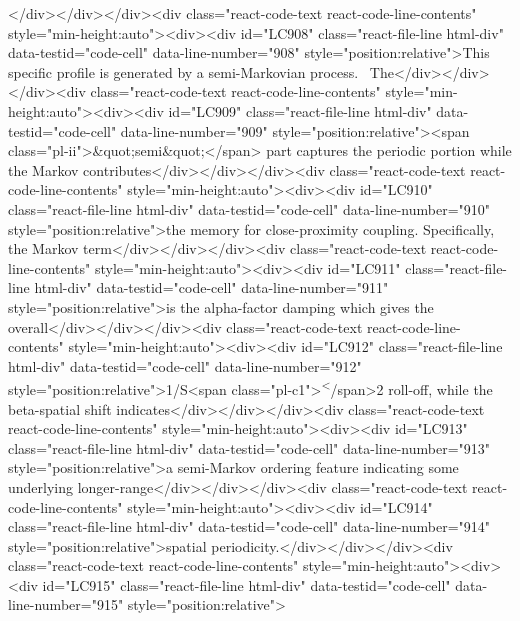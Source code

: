 {{{{{{</div></div></div><div class="react-code-text react-code-line-contents" style="min-height:auto"><div><div id="LC908" class="react-file-line html-div" data-testid="code-cell" data-line-number="908" style="position:relative">This specific profile is generated by a semi-Markovian process.~ The</div></div></div><div class="react-code-text react-code-line-contents" style="min-height:auto"><div><div id="LC909" class="react-file-line html-div" data-testid="code-cell" data-line-number="909" style="position:relative"><span class="pl-ii">&quot;semi&quot;</span> part captures the periodic portion while the Markov contributes</div></div></div><div class="react-code-text react-code-line-contents" style="min-height:auto"><div><div id="LC910" class="react-file-line html-div" data-testid="code-cell" data-line-number="910" style="position:relative">the memory for close-proximity coupling. Specifically, the Markov term</div></div></div><div class="react-code-text react-code-line-contents" style="min-height:auto"><div><div id="LC911" class="react-file-line html-div" data-testid="code-cell" data-line-number="911" style="position:relative">is the alpha-factor damping which gives the overall</div></div></div><div class="react-code-text react-code-line-contents" style="min-height:auto"><div><div id="LC912" class="react-file-line html-div" data-testid="code-cell" data-line-number="912" style="position:relative">1/S<span class="pl-c1">\textsuperscript</span>{2} roll-off, while the beta-spatial shift indicates</div></div></div><div class="react-code-text react-code-line-contents" style="min-height:auto"><div><div id="LC913" class="react-file-line html-div" data-testid="code-cell" data-line-number="913" style="position:relative">a semi-Markov ordering feature indicating some underlying longer-range</div></div></div><div class="react-code-text react-code-line-contents" style="min-height:auto"><div><div id="LC914" class="react-file-line html-div" data-testid="code-cell" data-line-number="914" style="position:relative">spatial periodicity.</div></div></div><div class="react-code-text react-code-line-contents" style="min-height:auto"><div><div id="LC915" class="react-file-line html-div" data-testid="code-cell" data-line-number="915" style="position:relative">
}}}}}}
